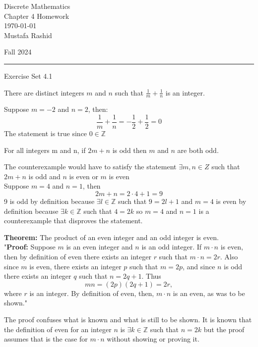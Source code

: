 \documentclass[12pt,letterpaper, onecolumn]{exam}
\begin{document}
	
	\begingroup  
	\noindent\LARGE Discrete Mathematics\\
	\noindent\LARGE Chapter 4 Homework\\
	\noindent\large \today\\
	\noindent\large Mustafa Rashid\par
	\noindent\large Fall 2024\par
	\endgroup
	\rule{\textwidth}{0.4pt}
	\pointsdroppedatright
	\printanswers
	\renewcommand{\solutiontitle}{\noindent\textbf{Ans:}\enspace}  
	
	\centering\large Exercise Set 4.1\\
	\begin{questions}
		\setcounter{question}{4} \question  There are distinct integers $m$ and $n$ such that $\frac{1}{m}+\frac{1}{n}$ is an integer.
		
		\begin{solution}
			 Suppose $m=-2$ and $n=2$, then:
			 $$\frac{1}{m}+\frac{1}{n} = -\frac{1}{2}+\frac{1}{2}=0$$
			 The statement is true since $0 \in \mathbb{Z}$
		\end{solution}
		
		\setcounter{question}{12} \question For all integers m and n, if $2m+n$ is odd then $m$ and $n$ are both odd.
		
	 \begin{solution}
	 	The counterexample would have to satisfy the statement $\exists m,n \in Z$ such that $2m+n$ is odd and $n$ is even or $m$ is even\\
	 	Suppose $m=4$ and $n=1$, then
	 	$$2m+n = 2\cdot4 + 1 = 9$$
	 	9 is odd by definition because $\exists l \in \mathbb{Z}$ such that $9=2l+1$ and $m=4$ is even by definition because $\exists k \in \mathbb{Z}$ such that $4=2k$ so $m=4$ and $n=1$ is a counterexample that disproves the statement.
	 \end{solution}
		
		\setcounter{question}{40} \question \textbf{Theorem:} The product of an even integer and an odd integer is even.\\
		"\textbf{Proof:} Suppose $m$ is an even integer and $n$ is an odd integer. If $m\cdot n$ is even, then by definition of even there exists an integer $r$ such that $m\cdot n = 2r$. Also since $m$ is even, there exists an integer $p$ such that $m=2p$, and since $n$ is odd there exists an integer $q$ such that $n=2q+1$. Thus $$mn = (2p)(2q+1) = 2r,$$ where $r$ is an integer. By definition of even, then, $m\cdot n$ is an even, as was to be shown."
		\begin{solution}
			The proof confuses what is known and what is still to be shown. It is known that the definition of even for an integer $n$ is $\exists k \in \mathbb{Z}$ such that $n=2k$ but the proof assumes that is the case for $m\cdot n$ without showing or proving it.
		\end{solution}
		

\end{questions}
\end{document}
